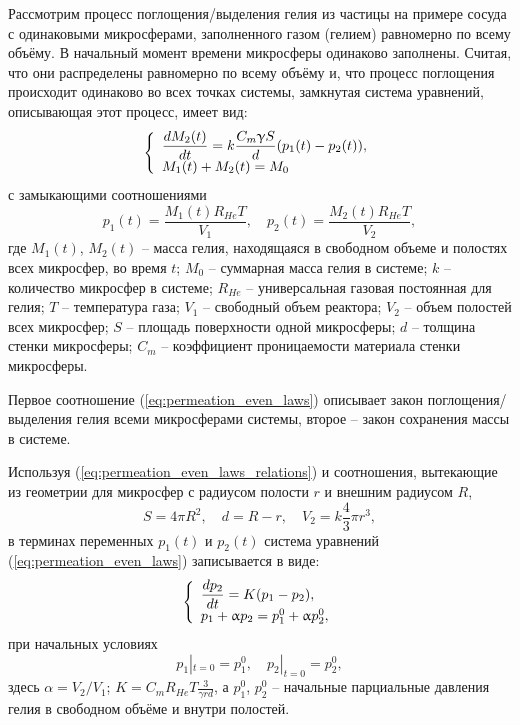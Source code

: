 Рассмотрим процесс поглощения/выделения гелия из частицы на примере сосуда с одинаковыми микросферами, заполненного газом (гелием) равномерно по всему объёму. В начальный момент времени микросферы одинаково заполнены.  Считая, что они распределены равномерно по всему объёму и, что процесс поглощения происходит одинаково во всех точках системы, замкнутая система уравнений, описывающая этот процесс, имеет вид:
\begin{equation}
\left\{
\begin{array}{l}
\label{eq:permeation_even_laws}
\displaystyle\frac{dM_2(t)}{dt}= k\frac{C_m\upgamma S}{d}(p_1(t)-p_2(t)), \\
M_1(t)+M_2(t)=M_0
\end{array}
\right.
\end{equation}
с замыкающими соотношениями
\begin{equation}
\label{eq:permeation_even_laws_relations}
\displaystyle p_1(t) = \frac{M_1(t)R_{He}T}{V_1},\quad p_2(t)=\frac{M_2(t)R_{He}T}{V_2},
\end{equation}
где  $M_1(t)$, $M_2(t)$ -- масса гелия, находящаяся в свободном объеме и полостях всех микросфер, во время $t$; $M_0$ -- суммарная масса гелия в системе; $k$ -- количество микросфер в системе; $R_{He}$ -- универсальная газовая постоянная для гелия; $T$ -- температура газа; $V_1$ -- свободный объем реактора; $V_2$ -- объем  полостей всех микросфер; $S$ -- площадь поверхности одной микросферы; $d$ -- толщина стенки микросферы; $C_m$ -- коэффициент проницаемости материала стенки микросферы. 

Первое соотношение (\ref{eq:permeation_even_laws}) описывает закон поглощения/выделения гелия всеми микросферами системы, второе -- закон сохранения массы в системе. 

Используя  (\ref{eq:permeation_even_laws_relations}) и соотношения, вытекающие из геометрии для микросфер с радиусом полости $r$ и внешним радиусом $R$,
\[
S=4\pi R^2,\quad d=R-r,\quad V_2=k\frac{4}{3}\pi r^3,
\]
в терминах переменных $p_1(t)$ и $p_2(t)$ система уравнений (\ref{eq:permeation_even_laws}) записывается в виде:
\begin{equation}
\left\{
\begin{array}{l}
\label{eq:permeation_even_laws_p} 
\displaystyle \frac{dp_2}{dt}  =  K(p_1-p_2), \\
p_1+\upalpha p_2  =  p_1^0 + \upalpha p_2^0, 
\end{array}
\right.
\end{equation}
при начальных условиях
\begin{equation}
\label{eq:permeation_even_laws_cauchy} p_1|_{t=0}=p_1^0,\quad p_2|_{t=0}=p_2^0,
\end{equation}
здесь $\alpha=V_2/V_1$; $K = C_m R_{He} T\displaystyle\frac{3}{\gamma rd}$, а $p_1^0$, $p_2^0$ -- начальные парциальные давления гелия в свободном объёме и внутри полостей. 

